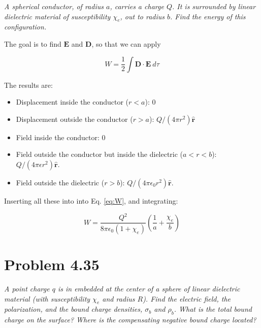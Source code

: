 \documentclass[10pt]{article}
\begin{document}
\textit{A spherical conductor, of radius $a$, carries a charge $Q$.  It is surrounded by linear dielectric material of susceptibility $\chi_e$, out to radius $b$.  Find the energy of this configuration.}

The goal is to find $\mathbf{E}$ and $\mathbf{D}$, so that we can apply

\begin{equation}
W = \frac{1}{2}\int \mathbf{D} \cdot \mathbf{E} ~ d\tau \label{eq:W}
\end{equation}

The results are:

\begin{itemize}
\item Displacement inside the conductor ($r<a$): 0
\item Displacement outside the conductor ($r>a$): $Q/(4\pi r^2)\hat{\mathbf{r}}$
\item Field inside the conductor: 0
\item Field outside the conductor but inside the dielectric ($a<r<b$): $Q/(4\pi\epsilon r^2)\hat{\mathbf{r}}$.
\item Field outside the dielectric ($r>b$): $Q/(4\pi\epsilon_0 r^2)\hat{\mathbf{r}}$.
\end{itemize}

Inserting all these into into Eq. \ref{eq:W}, and integrating:

\begin{equation}
W = \frac{Q^2}{8\pi\epsilon_0(1+\chi_e)}\left( \frac{1}{a}+\frac{\chi_e}{b}\right)
\end{equation}

\section{Problem 4.35}

\textit{A point charge $q$ is in embedded at the center of a sphere of linear dielectric material (with susceptibility $\chi_e$ and radius $R$).  Find the electric field, the polarization, and the bound charge densities, $\sigma_b$ and $\rho_b$.  What is the total bound charge on the surface? Where is the compensating negative bound charge located?}
\end{document}
